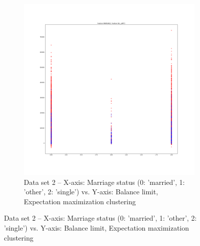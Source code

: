 \documentclass[
letterpaper, %
]{IEEEtran}
\begin{document}
	\begin{figure}[ht]\ContinuedFloat
		\begin{subfigure}{.5\textwidth}
			\centering
			\includegraphics[width=\linewidth]{./images/ds2/clustering/kmeans/gmmarriagelimitbal2.png}
			\caption{Data set 2 -- X-axis: Marriage status (0: 'married', 1: 'other', 2: 'single') vs. Y-axis: Balance limit, Expectation maximization clustering}
			\label{fig:gmds2}
		\end{subfigure}
	\end{figure}
\end{document}
